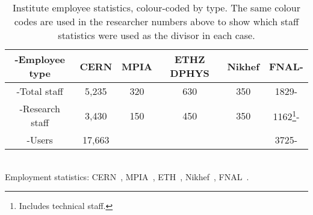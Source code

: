 \documentclass[../SustainableHEP.tex]{subfiles}
\begin{document}
\begin{table*}[h]
{\footnotesize
{}
\centering
\begin{tabular}{>{\kern-\tabcolsep}cccccc<{\kern-\tabcolsep}}
\toprule
Employee type& CERN & MPIA & ETHZ DPHYS & Nikhef & FNAL\\
\midrule
Total staff & 5,235 & 320 & 630 & 350 & 1829\\
\cellcolor{Pythongreen!20}Research staff &\cellcolor{Pythongreen!20} 3,430 &\cellcolor{Pythongreen!20} 150 &\cellcolor{Pythongreen!20} 450 &\cellcolor{Pythongreen!20}  350 &\cellcolor{Pythongreen!20} 1162\footnote{Includes technical staff.}\\
\cellcolor{Pythonblue!30}Users & \cellcolor{Pythonblue!30}17,663& \cellcolor{Pythonblue!30}&\cellcolor{Pythonblue!30} & \cellcolor{Pythonblue!30}& \cellcolor{Pythonblue!30}3725\\
\bottomrule
\end{tabular}}\\
\scriptsize{Employment statistics: CERN~\cite{CERN-HR-STAFF-STAT-2019}, MPIA~\cite{Jahnke2020}, ETH~\cite{Beisert2020}, Nikhef~\cite{Nikhef}, FNAL~\cite{FNALPrivate2}.}
\caption[Employee statistics for \ACR\ institutions]{Institute employee statistics, colour-coded by type.  The same colour codes are used in the researcher numbers above to show which staff statistics were used as the divisor in each case.\label{tab:ComparativeEmissionsDenominator}}
\end{table*}
\end{document}
